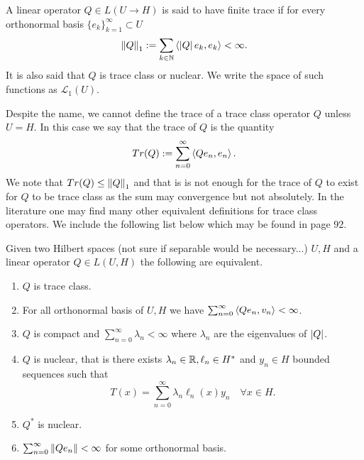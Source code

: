 \documentclass[
    a4paper,
    DIV=14,
    abstract=true,
    numbers=noenddot
]{scrartcl}
\begin{document}
\begin{definition}
	A linear operator $Q\in L(U\to H)$ is said to have finite trace if for every orthonormal basis $\{e_k\}_{k=1}^\infty \subset  U$
	\begin{equation*}
		\left\lVert Q \right\rVert_1:=\sum_{k\in\mathbb{N}}\left\langle\left| Q \right|e_k,e_k\right\rangle<\infty.
	\end{equation*}
	It is also said that $Q$ is trace class or nuclear. We write the space of such functions as $\mathcal{L}_1(U)$.
\end{definition}
Despite the name, we cannot define the trace of a trace class operator $Q$ unless  $U=H$. In this case we say that the trace of $Q$ is the quantity
\begin{equation*}
	Tr(Q):=\sum_{n=0}^{\infty} \left\langle Q e_n,e_n\right\rangle.
\end{equation*}
We note that $Tr(Q)\leq \left\lVert Q \right\rVert_1$ and that is is not enough for the trace of $Q$ to exist for $Q$ to be trace class as the sum may convergence but not absolutely. In the literature one may find many other equivalent definitions for trace class operators. We include the following list below which may be found in \cite{lototsky2017stochastic} page $92$.
\begin{proposition} Given two Hilbert spaces (not sure if separable would be necessary...) $U,H$ and a linear operator  $Q\in L(U,H)$ the following are equivalent.
	\begin{enumerate}
		\item $Q$ is trace class.
		\item For all orthonormal basis of $U,H$ we have $\sum_{n=0}^{\infty} \left\langle Qe_n,v_n\right\rangle<\infty$.
		\item $Q$ is compact and  $\sum_{n=0}^{\infty} \lambda _n<\infty$ where $\lambda _n$ are the eigenvalues of $\left| Q \right|$.
		\item $Q$ is nuclear, that is there exists  $\lambda _n \in \mathbb{R},\ell_n \in H^*$ and $y_n \in H$ bounded sequences such that
		      \begin{equation*}
			      T(x)=\sum_{n=0}^{\infty} \lambda _n\ell_n(x)y_n \quad\forall x\in H.
		      \end{equation*}
		\item $Q^*$ is nuclear.
		\item $\sum_{n=0}^{\infty} \left\lVert Qe_n \right\rVert<\infty$ for some orthonormal basis.

	\end{enumerate}
\end{proposition}
\end{document}
